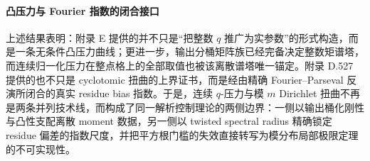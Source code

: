 




\paragraph{凸压力与 Fourier 指数的闭合接口}
上述结果表明：附录 E 提供的并不只是“把整数 \(q\) 推广为实参数”的形式构造，而是一条无条件凸压力曲线；更进一步，输出分桶矩阵族已经完备决定整数矩谱塔，而连续归一化压力在整点格上的全部取值也被该离散谱塔唯一锚定。附录 D.527 提供的也不只是 cyclotomic 扭曲的上界证书，而是经由精确 Fourier--Parseval 反演所闭合的真实 residue bias 指数。于是，连续 \(q\)-压力与模 \(m\) Dirichlet 扭曲不再是两条并列技术线，而构成了同一解析控制理论的两侧边界：一侧以输出桶化刚性与凸性支配离散 moment 数据，另一侧以 twisted spectral radius 精确锁定 residue 偏差的指数尺度，并把平方根门槛的失效直接转写为模分布局部极限定理的不可实现性。
